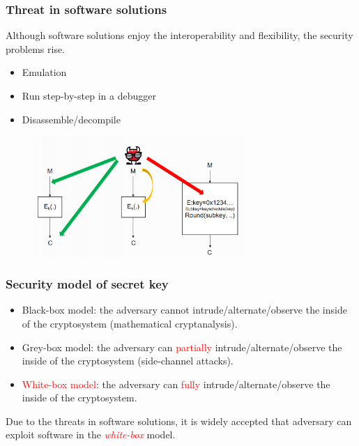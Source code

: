 \documentclass{beamer}
\begin{document}
\frame
{
\frametitle{Threat in software solutions}
Although software solutions enjoy the interoperability and flexibility, the security problems rise.
\begin{itemize}
\setlength{\itemsep}{12pt}
\item Emulation
\item Run step-by-step in a debugger
\item Disassemble/decompile
\end{itemize}

\begin{figure}[htbp]
\centering
  \includegraphics[width=8cm]{./pics/WBC_Model.png}
\end{figure}

}

\frame
{
\frametitle{Security model of secret key}

\begin{itemize}
 \setlength{\itemsep}{12pt}
 \item Black-box model: the adversary cannot intrude/alternate/observe the inside of the cryptosystem (mathematical cryptanalysis).

 \item Grey-box model: the adversary can \textcolor{red}{partially} intrude/alternate/observe the inside of the cryptosystem (side-channel attacks).

 \item \textcolor{red}{White-box model}: the adversary can \textcolor{red}{fully} intrude/alternate/observe the inside of the cryptosystem.
\end{itemize}

Due to the threats in software solutions, it is widely accepted that adversary can exploit software in the \textcolor{red}{\textit{white-box}} model.
}
\end{document}
